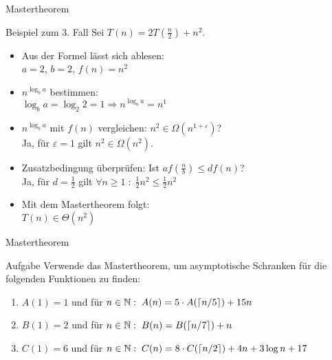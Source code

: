 \begin{frame}{Mastertheorem}
    \begin{exampleblock}{Beispiel zum 3. Fall}
    	Sei $T(n) = 2 T \left(\frac{n}{2} \right) + n^2$.
    	\begin{itemize}
    		\item Aus der Formel lässt sich ablesen:\\
    			$a=2$, $b=2$, $f(n)=n^2$
    		\item $n^{\log_b a}$ bestimmen:\\
    			$\log_b a = \log_2 2 = 1 \Rightarrow n^{\log_b a} = n^1$
    		\item $n^{\log_b a}$ mit $f(n)$ vergleichen: $n^2 \in \Omega(n^{1+\varepsilon})$?\\
    			Ja, für $\varepsilon = 1$ gilt $n^2 \in \Omega(n^2)$.
    		\item Zusatzbedingung überprüfen: Ist $af\left(\frac{n}{b}\right)\leq d f(n)$?\\
    			Ja, für $d = \frac{1}{2}$ gilt $\forall n \geq 1 \; : \; \frac{1}{2}n^2 \leq \frac{1}{2}n^2$
    		\item Mit dem Mastertheorem folgt:\\
    			$T(n) \in \Theta(n^2)$
    	\end{itemize}
    \end{exampleblock}
\end{frame}

\begin{frame}{Mastertheorem}

    \begin{exampleblock}{Aufgabe}
        Verwende das Mastertheorem, um asymptotische Schranken für die folgenden Funktionen zu finden:
        \begin{enumerate}
            \item $A(1)=1$ und für $n \in \mathbb{N} : \; A(n) = 5 \cdot A(\lceil n / 5 \rceil) + 15n$
            \item $B(1)=2$ und für $n \in \mathbb{N} : \; B(n) = B(\lceil n / 7 \rceil) + n$
            \item $C(1)=6$ und für $n \in \mathbb{N} : \; C(n) = 8 \cdot C(\lceil n / 2 \rceil) + 4n + 3 \log n + 17$
        \end{enumerate}
    \end{exampleblock}

\end{frame}

